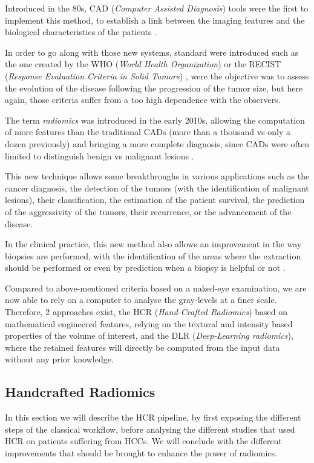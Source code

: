 \documentclass[]{article}
\begin{document}
Introduced in the 80s, CAD (\emph{Computer Assisted Diagnosis}) tools
were the first to implement this method, to establish a link between the
imaging features and the biological characteristics of the patients
\cite{Doi2007}.

In order to go along with those new systems, standard were introduced
such as the one created by the WHO (\emph{World Health Organization}) or the RECIST (\emph{Response Evaluation Criteria in Solid Tumors})
\cite{Jaffe2006}, were the objective was to assess the
evolution of the disease following the progression of the tumor size,
but here again, those criteria suffer from a too high dependence with
the observers.

The term \emph{radiomics} was introduced in the early 2010s, allowing
the computation of more features than the traditional CADs (more
than a thousand vs only a dozen previously) and bringing a more complete
diagnosis, since CADs were often limited to distinguish benign vs
malignant lesions \cite{Afshar2018}.

This new technique allows some breakthroughs in various applications
such as the cancer diagnosis, the detection of the tumors (with the
identification of malignant lesions), their classification, the
estimation of the patient survival, the prediction of the aggressivity
of the tumors, their recurrence, or the advancement of the disease.

In the clinical practice, this new method also allows an improvement in
the way biopsies are performed, with the identification of the areas
where the extraction should be performed \cite{Gillies2016}
or even by prediction when a biopsy is helpful or not \cite{Liu2016}.

Compared to above-mentioned criteria based on a naked-eye examination,
we are now able to rely on a computer to analyse the gray-levels at a
finer scale. Therefore, 2 approaches exist, the HCR (\emph{Hand-Crafted
Radiomics}) based on mathematical engineered features, relying on the
textural and intensity based properties of the volume of interest, and
the DLR (\emph{Deep-Learning radiomics}), where the retained features
will directly be computed from the input data without any prior
knowledge.

\subsection{Handcrafted Radiomics }\label{handcrafted-radiomics}

In this section we will describe the HCR pipeline, by first
exposing the different steps of the classical workflow, before analysing
the different studies that used HCR on patients suffering from
HCCs. We will conclude with the different improvements that
should be brought to enhance the power of radiomics.
\end{document}
